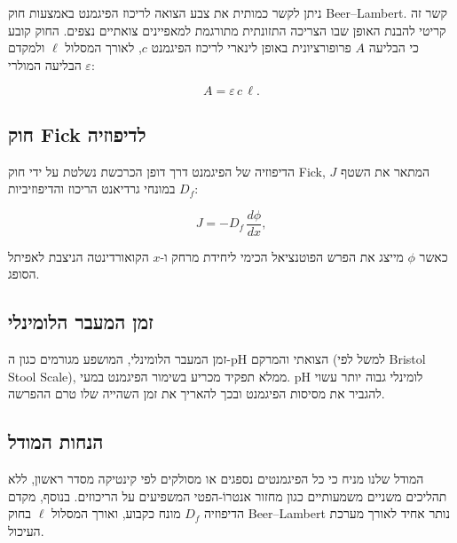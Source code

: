 \begin{hebrew}ניתן לקשר כמותית את צבע הצואה לריכוז הפיגמנט באמצעות חוק \textenglish{Beer--Lambert}. קשר זה קריטי להבנת האופן שבו הצריכה התזונתית מתורגמת למאפיינים צואתיים נצפים. החוק קובע כי הבליעה $A$ פרופורציונית באופן לינארי לריכוז הפיגמנט $c$, לאורך המסלול $\ell$ ולמקדם הבליעה המולרי $\varepsilon$:\end{hebrew}

$$A = \varepsilon\, c\, \ell.$$

\subsection{\texthebrew{חוק \textenglish{Fick} לדיפוזיה}}

\begin{hebrew}הדיפוזיה של הפיגמנט דרך דופן הכרכשת נשלטת על ידי חוק \textenglish{Fick}, המתאר את השטף $J$ במונחי גרדיאנט הריכוז והדיפוזיביות $D_f$:\end{hebrew}

$$J = -D_f\,\frac{d\phi}{dx},$$

\begin{hebrew}כאשר $\phi$ מייצג את הפרש הפוטנציאל הכימי ליחידת מרחק ו-$x$ הקואורדינטה הניצבת לאפיתל הסופג.\end{hebrew}

\subsection{\texthebrew{זמן המעבר הלומינלי}}

\begin{hebrew}זמן המעבר הלומינלי, המושפע מגורמים כגון ה-\textenglish{pH} הצואתי והמרקם (למשל לפי \textenglish{Bristol Stool Scale}), ממלא תפקיד מכריע בשימור הפיגמנט במעי. \textenglish{pH} לומינלי גבוה יותר עשוי להגביר את מסיסות הפיגמנט ובכך להאריך את זמן השהייה שלו טרם ההפרשה.\end{hebrew}

\subsection{\texthebrew{הנחות המודל}}

\begin{hebrew}המודל שלנו מניח כי כל הפיגמנטים נספגים או מסולקים לפי קינטיקה מסדר ראשון, ללא תהליכים משניים משמעותיים כגון מחזור אנטרוֹ-הפטי המשפיעים על הריכוזים. בנוסף, מקדם הדיפוזיה $D_f$ מונח כקבוע, ואורך המסלול $\ell$ בחוק \textenglish{Beer--Lambert} נותר אחיד לאורך מערכת העיכול.\end{hebrew}

